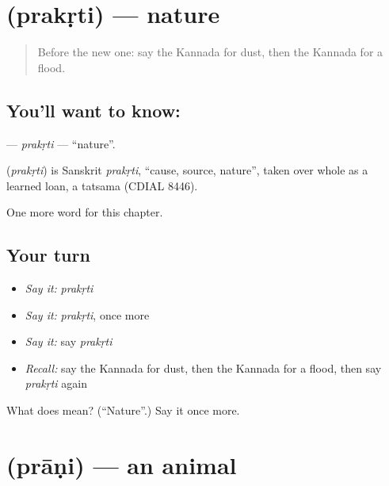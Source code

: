 \section[\texorpdfstring{\kn{ಪ್ರಕೃತಿ} (prakṛti)}{ಪ್ರಕೃತಿ (prakṛti)}]{ (prakṛti) — nature}

\label{lesson:KA-C224-prakrti}



\begin{quote}
Before the new one: say the Kannada for dust, then the Kannada for a flood.
\end{quote}

\subsection*{You'll want to know: }
\textbf{} — \emph{prakṛti} — \textquotedblleft{}nature\textquotedblright{}.

\begin{cousinweb}
\textbf{} (\emph{prakṛti}) is Sanskrit \emph{prakṛti}, \textquotedblleft{}cause, source, nature\textquotedblright{}, taken over whole as a learned loan, a tatsama (CDIAL 8446).
\end{cousinweb}

\begin{grammarlens}[title={What you've built}]
One more word for this chapter.
\end{grammarlens}

\subsection*{Your turn}
\begin{itemize}
\raggedright
  \item \emph{Say it:} \emph{prakṛti}
  \item \emph{Say it:} \emph{prakṛti}, once more
  \item \emph{Say it:} say \emph{prakṛti}
  \item \emph{Recall:} say the Kannada for dust, then the Kannada for a flood, then say \emph{prakṛti} again
\end{itemize}

\begin{tcolorbox}[breakable,colback=teal!4,colframe=teal!35!black,title={Before you move on}]
What does  mean? (\textquotedblleft{}Nature\textquotedblright{}.) Say it once more.
\end{tcolorbox}
\section[\texorpdfstring{\kn{ಪ್ರಾಣಿ} (prāṇi)}{ಪ್ರಾಣಿ (prāṇi)}]{ (prāṇi) — an animal}

